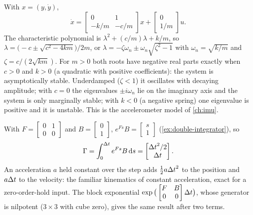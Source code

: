 \begin{solutions}
  \item With $x = (y, \dot y)$,
        \[
          \dot x = \begin{bmatrix}0 & 1\\ -k/m & -c/m\end{bmatrix}x + \begin{bmatrix}0\\ 1/m\end{bmatrix}u .
        \]
        The characteristic polynomial is $\lambda^2 + (c/m)\lambda + k/m$, so $\lambda = \big(-c \pm \sqrt{c^2 - 4km}\big)/2m$, or
        $\lambda = -\zeta\omega_n \pm \omega_n\sqrt{\zeta^2 - 1}$ with $\omega_n = \sqrt{k/m}$ and $\zeta = c/(2\sqrt{km})$. For $m > 0$ both roots have negative real parts
        exactly when $c > 0$ and $k > 0$ (a quadratic with positive coefficients): the system is asymptotically stable. Underdamped ($\zeta < 1$) it
        oscillates with decaying amplitude; with $c = 0$ the eigenvalues $\pm i\omega_n$ lie on the imaginary axis and the system is only marginally stable;
        with $k < 0$ (a negative spring) one eigenvalue is positive and it is unstable. This is the accelerometer model of \cref{ch:imu}.

  \item With $F = \begin{bmatrix}0 & 1\\0 & 0\end{bmatrix}$ and $B = \begin{bmatrix}0\\1\end{bmatrix}$, $e^{Fs}B = \begin{bmatrix}s\\1\end{bmatrix}$ (\cref{ex:double-integrator}), so
        \[
          \Gamma = \int_0^{\Delta t} e^{Fs}B\,\mathrm{d} s = \begin{bmatrix}{\Delta t}^2/2\\ {\Delta t}\end{bmatrix}.
        \]
        An acceleration $a$ held constant over the step adds $\tfrac12a{\Delta t}^2$ to the position and $a{\Delta t}$ to the velocity: the familiar kinematics of constant
        acceleration, exact for a zero-order-hold input. The block exponential $\exp\big(\begin{bmatrix}F & B\\0 & 0\end{bmatrix}{\Delta t}\big)$, whose generator is nilpotent
        ($3\times3$ with cube zero), gives the same result after two terms.


\end{solutions}
